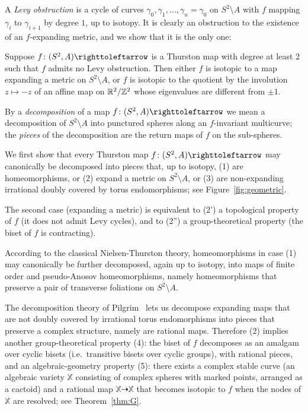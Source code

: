 \documentclass{amsart}
\begin{document}
A \emph{Levy obstruction} is a cycle of curves
$\gamma_0,\gamma_1,\dots,\gamma_n=\gamma_0$ on $S^2\setminus A$ with $f$
mapping $\gamma_i$ to $\gamma_{i+1}$ by degree $1$, up to isotopy. It is
clearly an obstruction to the existence of an $f$-expanding metric, and we
show that it is the only one:
\begin{mainthm}
  Suppose $f\colon (S^2,A)\selfmap$ is a Thurston map with degree at
  least $2$ such that $f$ admits no Levy obstruction. Then either $f$
  is isotopic to a map expanding a metric on $S^2\setminus A$, or $f$
  is isotopic to the quotient by the involution $z\mapsto -z$ of an
  affine map on ${\mathbb R}^2/{\mathbb Z}^2$ whose eigenvalues are different from
  $\pm1$.
\end{mainthm}

By a \emph{decomposition} of a map $f\colon(S^2,A)\selfmap$
we mean a decomposition of $S^2\setminus A$ into punctured spheres
along an $f$-invariant multicurve; the \emph{pieces} of the
decomposition are the return maps of $f$ on the sub-spheres.

We first show that every Thurston map $f\colon(S^2,A)\selfmap$ may
canonically be decomposed into pieces that, up to isotopy, (1) are
homeomorphisms, or (2) expand a metric on $S^2\setminus A$, or (3) are
non-expanding irrational doubly covered by torus endomorphisms; see
Figure~\ref{fig:geometric}.

The second case (expanding a metric) is equivalent to (2') a
topological property of $f$ (it does not admit Levy cycles), and to
(2'') a group-theoretical property (the biset of $f$ is contracting).

According to the classical Nielsen-Thurston theory, homeomorphisms in
case (1) may canonically be further decomposed, again up to isotopy,
into maps of finite order and pseudo-Anosov homeomorphisms, namely
homeomorphisms that preserve a pair of transverse foliations on
$S^2\setminus A$.

The decomposition theory of Pilgrim~\cite{pilgrim:combinations} lets
us decompose expanding maps that are not doubly covered by irrational
torus endomorphisms into pieces that preserve a complex structure,
namely are rational maps. Therefore (2) implies another
group-theoretical property (4): the biset of $f$ decomposes as an
amalgam over cyclic bisets (i.e.\ transitive bisets over cyclic
groups), with rational pieces, and an algebraic-geometry property (5):
there exists a complex stable curve (an algebraic variety $\mathbb X$
consisting of complex spheres with marked points, arranged as a
cactoid) and a rational map $\mathbb X\dashrightarrow\mathbb X$ that
becomes isotopic to $f$ when the nodes of $\mathbb X$ are resolved;
see Theorem~\ref{thm:G}.
\end{document}
